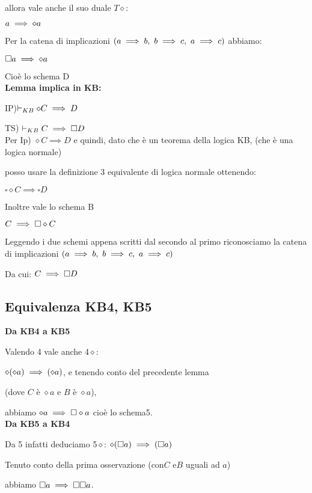 allora vale anche il suo duale $T\diamond$:

$a\implies\diamond a$

Per la catena di implicazioni $(\implica ab,\ \implica bc,\ \mbox{\ensuremath{\implica ac}})$
abbiamo:

$\square a\implies\diamond a$

Cioè lo schema D\\


\textbf{Lemma implica in KB:}

IP)$\vdash_{KB}\diamond C\implies D$

TS) $\vdash_{KB}C\implies\square D$\\


Per Ip) $\diamond C\implies D$ e quindi, dato che è un teorema della
logica KB, (che è una logica normale)

posso usare la definizione 3 equivalente di logica normale ottenendo:

$\square\diamond C\implies\square D$ 

Inoltre vale lo schema B

$C\implies\square\diamond C$

Leggendo i due schemi appena scritti dal secondo al primo riconosciamo
la catena di implicazioni $(\implica ab,\ \implica bc,\ \mbox{\ensuremath{\implica ac}})$ 

Da cui: $C\implies\square D$


\subsection{Equivalenza KB4, KB5}

\textbf{Da KB4 a KB5}

Valendo 4 vale anche 4$\diamond$:

$\diamond(\diamond a)\implies(\diamond a)$, e tenendo conto del precedente
lemma 

(dove $C$ è $\diamond a$ e $B$ è $\diamond a$), 

abbiamo $\diamond a\implies\square\diamond a$ cioè lo schema5. \\


\textbf{Da KB5 a KB4}

Da 5 infatti deduciamo 5$\diamond$: $\diamond(\square a)\implies(\square a)$

Tenuto conto della prima osservazione (con$C$ e$B$ uguali ad $a$)

abbiamo $\square a\implies\square\square a$.\\



